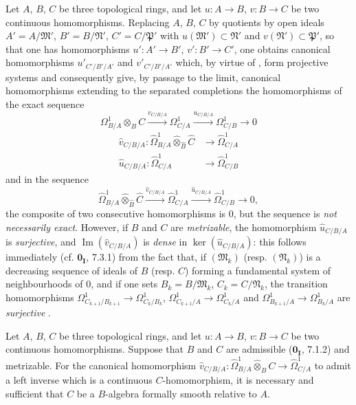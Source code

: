 \begin{env}[20.7.17]
\label{0.20.7.17}
Let $A$, $B$, $C$ be three topological rings, and let $u:A\to B$, $v:B\to C$ be two continuous homomorphisms. Replacing $A$, $B$, $C$ by quotients by open ideals $A'=A/\mathfrak{M}'$, $B'=B/\mathfrak{N}'$, $C'=C/\mathfrak{P}'$ with $u(\mathfrak{M}')\subset\mathfrak{N}'$ and $v(\mathfrak{N}')\subset\mathfrak{P}'$, so that one has homomorphisms $u':A'\to B'$, $v':B'\to C'$, one obtains canonical homomorphisms $u'_{C'/B'/A'}$ and $v'_{C'/B'/A'}$ which, by virtue of , form projective systems and consequently give, by passage to the limit, canonical homomorphisms extending to the separated completions the homomorphisms of the exact sequence 
\[
  \Omega^1_{B/A}\otimes_B C\xrightarrow{v_{C/B/A}}\Omega^1_{C/A}\xrightarrow{u_{C/B/A}}\Omega^1_{C/B}\longrightarrow 0
\]
\begin{align}
  \widehat{v}_{C/B/A}:\widehat{\Omega}^1_{B/A}\widehat{\otimes}_{\widehat{B}}\widehat{C}&\longrightarrow\widehat{\Omega}^1_{C/A} \tag{20.7.17.1}\label{0.20.7.17.1}\\
  \widehat{u}_{C/B/A}:\widehat{\Omega}^1_{C/A}&\longrightarrow\widehat{\Omega}^1_{C/B} \tag{20.7.17.2}\label{0.20.7.17.2}
\end{align}
and in the sequence
\begin{equation}
\tag{20.7.17.3}
\label{0.20.7.17.3}
  \widehat{\Omega}^1_{B/A}\widehat{\otimes}_{\widehat{B}}\widehat{C}
  \xrightarrow{\widehat{v}_{C/B/A}}\widehat{\Omega}^1_{C/A}
  \xrightarrow{\widehat{u}_{C/B/A}}\widehat{\Omega}^1_{C/B}\longrightarrow 0,
\end{equation}
the composite of two consecutive homomorphisms is $0$, but the sequence is \emph{not necessarily exact}. However, if $B$ and $C$ are \emph{metrizable}, the homomorphism $\widehat{u}_{C/B/A}$ is \emph{surjective}, and $\operatorname{Im}(\widehat{v}_{C/B/A})$ is \emph{dense} in $\ker(\widehat{u}_{C/B/A})$: this follows immediately (cf. $\mathbf{0_I}$, 7.3.1) from the fact that, if $(\mathfrak{M}_k)$ (resp. $(\mathfrak{N}_k)$) is a decreasing sequence of ideals of $B$ (resp. $C$) forming a fundamental system of neighbourhoods of $0$, and if one sets $B_k=B/\mathfrak{M}_k$, $C_k=C/\mathfrak{N}_k$, the transition homomorphisms $\Omega^1_{C_{k+1}/B_{k+1}}\to\Omega^1_{C_k/B_k}$, $\Omega^1_{C_{k+1}/A}\to\Omega^1_{C_k/A}$ and $\Omega^1_{B_{k+1}/A}\to\Omega^1_{B_k/A}$ are \emph{surjective} .
\end{env}

\begin{proposition}[20.7.18]
\label{0.20.7.18}
Let $A$, $B$, $C$ be three topological rings, and let $u:A\to B$, $v:B\to C$ be two continuous homomorphisms. Suppose that $B$ and $C$ are admissible ($\mathbf{0_I}$, 7.1.2) and metrizable. For the canonical homomorphism $\widehat{v}_{C/B/A}:\widehat{\Omega}^1_{B/A}\widehat{\otimes}_B C\longrightarrow\widehat{\Omega}^1_{C/A}$
to admit a left inverse which is a continuous $C$-homomorphism, it is necessary and sufficient that $C$ be a $B$-algebra formally smooth relative to $A$.
\end{proposition}

